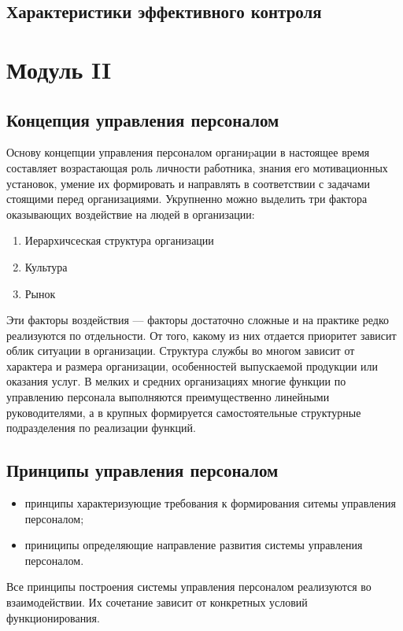 \documentclass[a4paper,12pt,oneside,final]{extarticle}
\numberwithin{equation}{section}
\begin{document}
\subsection{Характеристики эффективного контроля}

%
%
\section{Модуль II}
\subsection{Концепция управления персоналом}
Основу концепции управления персоналом органиpации в настоящее время составляет возрастающая роль личности работника, знания его мотивационных установок, умение их формировать и направлять в соответствии с задачами стоящими перед организациями. 
Укрупненно можно выделить три фактора оказывающих воздействие на людей в организации:
\begin{enumerate}
	\item Иерархичсеская структура организации
	\item Культура
	\item Рынок
\end{enumerate}
Эти факторы воздействия --- факторы достаточно сложные и на практике редко реализуются по отдельности. 
От того, какому из них отдается приоритет зависит облик ситуации в организации.
Структура службы во многом зависит от характера и размера организации, особенностей выпускаемой продукции или оказания услуг.
В мелких и средних организациях многие функции по управлению персонала выполняются преимущественно линейными руководителями, а в крупных формируется самостоятельные структурные подразделения по реализации функций.

\subsection{Принципы управления персоналом}
\begin{itemize}
	\item принципы характеризующие требования к формирования ситемы управления персоналом;
	\item приниципы определяющие направление развития системы управления персоналом.
\end{itemize}
Все принципы построения системы управления персоналом реализуются во взаимодействии. Их сочетание зависит от конкретных условий функционирования.
\end{document}
